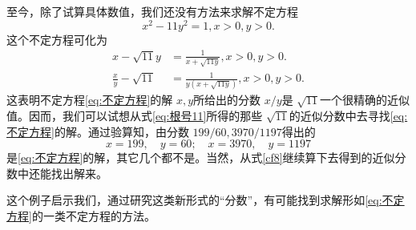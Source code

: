 \begin{example}
	至今，除了试算具体数值，我们还没有方法来求解不定方程
	\begin{equation}
		x^2 - 11y^2 = 1, x > 0, y > 0. \label{eq:不定方程}
	\end{equation}
	这个不定方程可化为
	\begin{align}
		x - \sqrt{11}y          & = \frac{1}{x + \sqrt{11y}}, x > 0, y > 0. \nonumber \\
		\frac{x}{y} - \sqrt{11} & = \frac{1}{y(x + \sqrt{11y})}, x > 0, y > 0.
	\end{align}
	这表明不定方程\eqref{eq:不定方程}的解 \( x, y \)所给出的分数 \( x/y \)是 \( \sqrt{11}
	\)一个很精确的近似值。因而，我们可以试想从式\eqref{eq:根号11}所得的那些 \( \sqrt{11}
	\)的近似分数中去寻找\eqref{eq:不定方程}的解。通过验算知，由分数 \( 199/60, 3970/1197 \)得出的
	\begin{equation}
		x=199,\quad y=60; \quad x=3970, \quad y=1197
	\end{equation}
	是\eqref{eq:不定方程}的解，其它几个都不是。当然，从式\eqref{cf8}继续算下去得到的近似分数中还能找出解来。

	这个例子启示我们，通过研究这类新形式的\enquote{分数}，有可能找到求解形如\eqref{eq:不定方程}的一类不定方程的方法。
\end{example}
